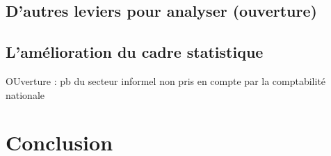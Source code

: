 \documentclass[
]{article}
\begin{document}
\hypertarget{dautres-leviers-pour-analyser-ouverture}{%
\subsection{D'autres leviers pour analyser
(ouverture)}\label{dautres-leviers-pour-analyser-ouverture}}

\hypertarget{lamuxe9lioration-du-cadre-statistique}{%
\subsection{L'amélioration du cadre
statistique}\label{lamuxe9lioration-du-cadre-statistique}}

OUverture : pb du secteur informel non pris en compte par la
comptabilité nationale

\hypertarget{conclusion}{%
\section{Conclusion}\label{conclusion}}

\printbibliography[title=Bibliographie]
\end{document}
